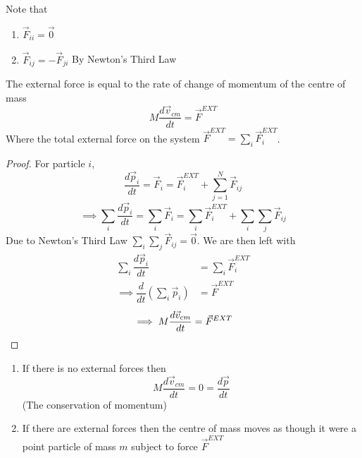 \documentclass[twoside]{scrartcl}
\begin{document}
Note that
\begin{enumerate}
\item $\vec{F}_{ii} = \vec{0}$
\item $\vec{F}_{ij} = -\vec{F}_{ji}$ By Newton's Third Law
\end{enumerate}

\begin{theorem}
The external force is equal to the rate of change of momentum of the centre of mass
	\[M\frac{d\vec{v}_{cm}}{dt} = \vec{F}^{EXT}\]
	Where the total external force on the system $\vec{F}^{EXT} = \sum_i\vec{F}_i^{EXT}$.
\end{theorem}
\begin{proof}

For particle $i$, \[\dfrac{d\vec{p}_i}{dt} = \vec{F}_i = \vec{F}_i^{EXT} + \sum_{j=1}^N\vec{F}_{ij}\] 
\[\implies \sum_i \dfrac{d\vec{p}_i}{dt} = \sum_i\vec{F}_i = \sum_i\vec{F}_i^{EXT} + \sum_i\sum_j\vec{F}_{ij} \]
Due to Newton's Third Law $\sum_i\sum_j\vec{F}_{ij} = \vec{0}$. We are then left with 
\[\begin{aligned}\sum_i\dfrac{d\vec{p}_i}{dt} &= \sum_i\vec{F}_i^{EXT}\\
\implies \dfrac{d}{dt}(\sum_i \vec{p}_i) &= \vec{F}^{EXT}\end{aligned}
\]
\[\implies M\frac{d\vec{v}_{cm}}{dt} = \vec{F}^{EXT}\qedhere\]
\end{proof}

\begin{enumerate}
\item If there is no external forces then 
\[M \frac{d\vec{v}_{cm}}{dt} = 0 = \frac{d\vec{p}}{dt}\]
(The conservation of momentum)
\item	If there are external forces then the centre of mass moves as though it were a point particle of mass $m$ subject to force $\vec{F}^{EXT}$
\end{enumerate}


\pagebreak

\begin{center}
\end{center}
\end{document}
